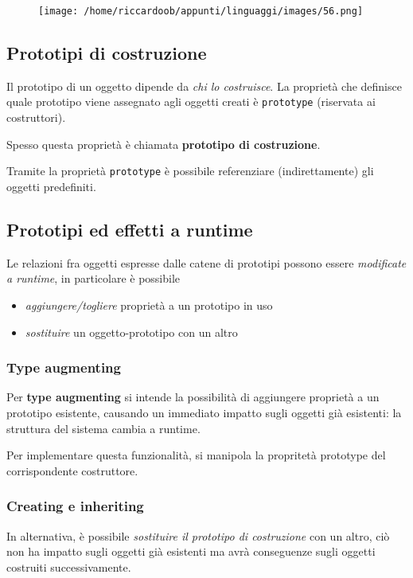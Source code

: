 \begin{figure}[H]
    \centering
    \texttt{[image: /home/riccardoob/appunti/linguaggi/images/56.png]}
\end{figure}

\subsection{Prototipi di costruzione}
Il prototipo di un oggetto dipende da \textit{chi lo costruisce}. La proprietà che definisce quale prototipo viene assegnato agli oggetti creati è \texttt{prototype} (riservata ai costruttori).

Spesso questa proprietà è chiamata \textbf{prototipo di costruzione}.

Tramite la proprietà \texttt{prototype} è possibile referenziare (indirettamente) gli oggetti predefiniti.

\subsection{Prototipi ed effetti a runtime}
Le relazioni fra oggetti espresse dalle catene di prototipi possono essere \textit{modificate a runtime}, in particolare è possibile
\begin{itemize}
    \item \textit{aggiungere/togliere} proprietà a un prototipo in uso
    \item \textit{sostituire} un oggetto-prototipo con un altro
\end{itemize}

\subsubsection{Type augmenting}
Per \textbf{type augmenting} si intende la possibilità di aggiungere proprietà a un prototipo esistente, causando un immediato impatto sugli oggetti già esistenti: la struttura del sistema cambia a runtime.

Per implementare questa funzionalità, si manipola la propritetà prototype del corrispondente costruttore.

\subsubsection{Creating e inheriting}
In alternativa, è possibile \textit{sostituire il prototipo di costruzione} con un altro, ciò non ha impatto sugli oggetti già esistenti ma avrà conseguenze sugli oggetti costruiti successivamente.

